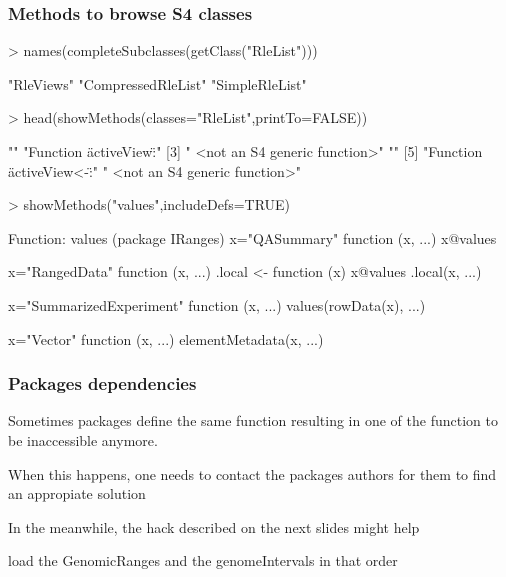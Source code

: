\documentclass{beamer}
\begin{document}

\begin{frame}[fragile]
\frametitle{Methods to browse S4 classes}
 \begin{uncoverenv}
\begin{Schunk}
\begin{Sinput}
> names(completeSubclasses(getClass("RleList")))
\end{Sinput}
\begin{Soutput}
[1] "RleViews"          "CompressedRleList" "SimpleRleList"    
\end{Soutput}
\begin{Sinput}
> head(showMethods(classes="RleList",printTo=FALSE))
\end{Sinput}
\begin{Soutput}
[1] ""                              "Function \"activeView\":"     
[3] " <not an S4 generic function>" ""                             
[5] "Function \"activeView<-\":"    " <not an S4 generic function>"
\end{Soutput}
\begin{Sinput}
> showMethods("values",includeDefs=TRUE)
\end{Sinput}
\begin{Soutput}
Function: values (package IRanges)
x="QASummary"
function (x, ...) 
{
    x@values
}


x="RangedData"
function (x, ...) 
{
    .local <- function (x) 
    x@values
    .local(x, ...)
}


x="SummarizedExperiment"
function (x, ...) 
{
    values(rowData(x), ...)
}


x="Vector"
function (x, ...) 
elementMetadata(x, ...)
\end{Soutput}
\end{Schunk}
  \end{uncoverenv}
\end{frame}


\begin{frame}
\frametitle{Packages dependencies}
 \bit
    \item Sometimes packages define the same function resulting in one of the function to be inaccessible anymore.
    \item When this happens, one needs to contact the packages authors for them to find an appropiate solution
    \item In the meanwhile, the hack described on the next slides might help
    \item load the GenomicRanges and the genomeIntervals in that order
 \eit
\end{frame}
\end{document}
